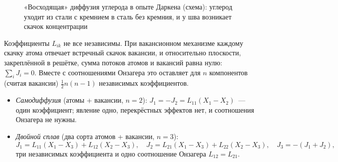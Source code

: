 \begin{figure}[ht]
\centering
{}
\caption{«Восходящая» диффузия углерода в опыте Даркена (схема):
углерод уходит из стали с кремнием в сталь без кремния, и у шва
возникает скачок концентрации}
\label{fig:darken-uphill}
\end{figure}

\begin{podrobnee}
Коэффициенты $L_{ik}$ не все независимы. При вакансионном механизме
каждому скачку атома отвечает встречный скачок вакансии, и относительно
плоскости, закреплённой в решётке, сумма потоков атомов и вакансий
равна нулю: $\sum_iJ_i=0$. Вместе с соотношениями Онзагера это
оставляет для $n$ компонентов (считая вакансии) $\frac12n(n-1)$
независимых коэффициентов.
\begin{itemize}
\item \emph{Самодиффузия} (атомы + вакансии, $n=2$): $J_1=-J_2=L_{11}(X_1-X_2)$~—
один коэффициент; явление одно, перекрёстных эффектов нет, и
соотношения Онзагера не нужны.
\item \emph{Двойной сплав} (два сорта атомов + вакансии, $n=3$):
\[
J_1=L_{11}(X_1-X_3)+L_{12}(X_2-X_3),\quad
J_2=L_{21}(X_1-X_3)+L_{22}(X_2-X_3),\quad J_3=-(J_1+J_2),
\]
три независимых коэффициента и одно соотношение Онзагера $L_{12}=L_{21}$.
\end{itemize}
\end{podrobnee}

